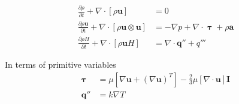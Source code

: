 \begin{subequations}
    \begin{align}
        \frac{\partial \rho}{\partial t} + \nabla \cdot [\rho\mathbf{u}] &= 0 \\
        \frac{\partial \rho\mathbf{u}}{\partial t} + \nabla \cdot [\rho\mathbf{u} \otimes \mathbf{u}] &= -\nabla p + \nabla \cdot \mathbf{\uptau} + \rho \mathbf{a} \\
        \frac{\partial \rho H}{\partial t} + \nabla \cdot [\rho\mathbf{u}H] &= \nabla \cdot \mathbf{q}'' + q'''
    \end{align}
\end{subequations}

In terms of primitive variables
\begin{subequations}
    \begin{align}
        \mathbf{\uptau} &= \mu \left[\nabla\mathbf{u} + (\nabla\mathbf{u})^T \right] - \frac{2}{3}\mu [\nabla \cdot \mathbf{u} ] \mathbf{I} \\
        \mathbf{q''} &= k\nabla T
    \end{align}
\end{subequations}



